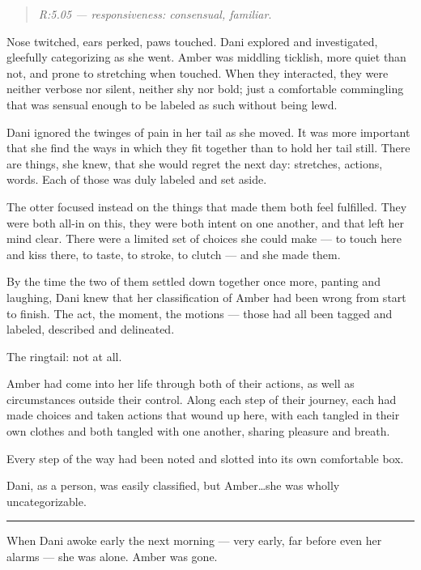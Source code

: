 \begin{quote}
\emph{R:5.05 --- responsiveness: consensual, familiar}.
\end{quote}

Nose twitched, ears perked, paws touched. Dani explored and investigated, gleefully categorizing as she went. Amber was middling ticklish, more quiet than not, and prone to stretching when touched. When they interacted, they were neither verbose nor silent, neither shy nor bold; just a comfortable commingling that was sensual enough to be labeled as such without being lewd.

Dani ignored the twinges of pain in her tail as she moved. It was more important that she find the ways in which they fit together than to hold her tail still. There are things, she knew, that she would regret the next day: stretches, actions, words. Each of those was duly labeled and set aside.

The otter focused instead on the things that made them both feel fulfilled. They were both all-in on this, they were both intent on one another, and that left her mind clear. There were a limited set of choices she could make --- to touch here and kiss there, to taste, to stroke, to clutch --- and she made them.

By the time the two of them settled down together once more, panting and laughing, Dani knew that her classification of Amber had been wrong from start to finish. The act, the moment, the motions --- those had all been tagged and labeled, described and delineated.

The ringtail: not at all.

Amber had come into her life through both of their actions, as well as circumstances outside their control. Along each step of their journey, each had made choices and taken actions that wound up here, with each tangled in their own clothes and both tangled with one another, sharing pleasure and breath.

Every step of the way had been noted and slotted into its own comfortable box.

Dani, as a person, was easily classified, but Amber\ldots{}she was wholly uncategorizable.

\begin{center}\rule{0.5\linewidth}{\linethickness}\end{center}

When Dani awoke early the next morning --- very early, far before even her alarms --- she was alone. Amber was gone.

